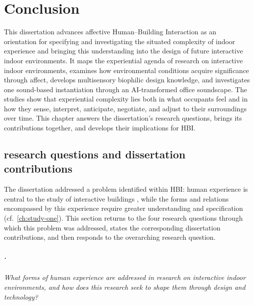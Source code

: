 \chapter{Conclusion}
\label{ch:conclusion}

\openingpara
{This dissertation advances affective Human--Building Interaction} {as an orientation for specifying and investigating the situated complexity of indoor experience and bringing this understanding into the design of future interactive indoor environments. It maps the experiential agenda of research on interactive indoor environments, examines how environmental conditions acquire significance through affect, develops multisensory biophilic design knowledge, and investigates one sound-based instantiation through an AI-transformed  office soundscape. The studies show that experiential complexity lies both in what occupants feel and in how they sense, interpret, anticipate, negotiate, and adjust to their surroundings over time. This chapter answers the dissertation's research questions, brings its contributions together, and develops their implications for HBI.}

\section{research questions and dissertation contributions}
\label{sec:returning-problem}

The dissertation addressed a problem identified within HBI: human experience is central to the study of interactive buildings \cite{alavi2019introduction,alavi2017comfort}, while the forms and relations encompassed by this experience require greater understanding and specification (cf.~\autoref{ch:study-one}). This section returns to the four research questions through which this problem was addressed, states the corresponding dissertation contributions, and then responds to the overarching research question.

\clearpage
\paragraph{.}

\emph{What forms of human experience are addressed in research on interactive indoor environments, and how does this research seek to shape them through design and technology?}

